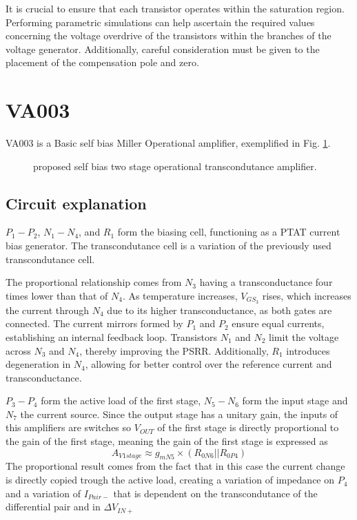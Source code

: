 \documentclass[12pt]{article}
\begin{document}
It is crucial to ensure that each transistor operates within the saturation region. Performing parametric simulations can help ascertain the required values concerning the voltage overdrive of the transistors within the branches of the voltage generator. Additionally, careful consideration must be given to the placement of the compensation pole and zero.

\section{VA003}

VA003 is a Basic self bias Miller Operational amplifier, exemplified in Fig. \ref{VA003}.
\begin{figure}[H]
        \centering
        
        \caption{proposed self bias two stage operational transcondutance amplifier.}
        \label{VA003}
\end{figure}



\subsection{Circuit explanation}
$P_1 - P_2$, $N_1 - N_4$, and $R_1$ form the biasing cell, functioning as a PTAT current bias generator.  The transcondutance cell is a variation of the previously used transcondutance cell.

The proportional relationship comes from $N_3$ having a transconductance four times lower than that of $N_4$. As temperature increases, $V_{GS_3}$ rises, which increases the current through $N_4$ due to its higher transconductance, as both gates are connected. The current mirrors formed by $P_1$ and $P_2$ ensure equal currents, establishing an internal feedback loop. Transistors $N_1$ and $N_2$ limit the voltage across $N_3$ and $N_4$, thereby improving the PSRR. Additionally, $R_1$ introduces degeneration in $N_4$, allowing for better control over the reference current and transconductance.


$P_3-P_4$ form the active load of the first stage, $N_5-N_6$ form the input stage and $N_7$ the current source.
Since the output stage has a unitary gain, the inputs of this amplifiers are switches so $V_{OUT}$ of the first stage is directly proportional to the gain of the first stage, meaning the gain of the first stage is expressed as
\begin{equation}
    A_{V1stage} \approx g_{mN5} \times (R_{0N6}||R_{0P4})
\end{equation}
The proportional result comes from the fact that in this case the current change is directly copied trough the active load, creating a variation of impedance on $P_4$ and a variation of $I_{Pair-}$ that is dependent on the transcondutance of the differential pair and in $\Delta V_{IN+}$
\end{document}
